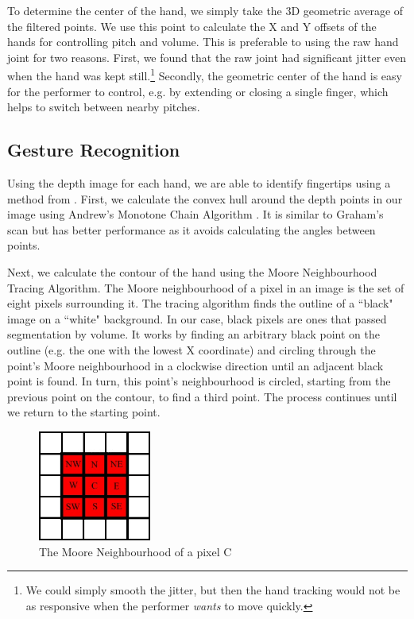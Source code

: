 \documentclass[12pt]{article}
\begin{document}
To determine the center of the hand, we simply take the 3D geometric average of the filtered points.  We use this point to calculate the X and Y offsets of the hands for controlling pitch and volume.  This is preferable to using the raw hand joint for two reasons.  First, we found that the raw joint had significant jitter even when the hand was kept still.\footnote{We could simply smooth the jitter, but then the hand tracking would not be as responsive when the performer \emph{wants} to move quickly.}  Secondly, the geometric center of the hand is easy for the performer to control, e.g. by extending or closing a single finger, which helps to switch between nearby pitches.

\subsection{Gesture Recognition}
Using the depth image for each hand, we are able to identify fingertips using a method from \cite{Li12}.  First, we calculate the convex hull around the depth points in our image using Andrew's Monotone Chain Algorithm \cite{And79}.  It is similar to Graham's scan \cite{Gra72} but has better performance as it avoids calculating the angles between points.

Next, we calculate the contour of the hand using the Moore Neighbourhood Tracing Algorithm.  The Moore neighbourhood of a pixel in an image is the set of eight pixels surrounding it.  The tracing algorithm finds the outline of a ``black" image on a ``white" background.  In our case, black pixels are ones that passed segmentation by volume.  It works by finding an arbitrary black point on the outline (e.g. the one with the lowest X coordinate) and circling through the point's Moore neighbourhood in a clockwise direction until an adjacent black point is found.  In turn, this point's neighbourhood is circled, starting from the previous point on the contour, to find a third point.  The process continues until we return to the starting point.

\begin{figure}
\caption{The Moore Neighbourhood of a pixel C}
\centering
\includegraphics[width=0.33\textwidth, natwidth=252, natheight=247]{Moore_Neighbourhood.jpg}
\end{figure}
\end{document}
